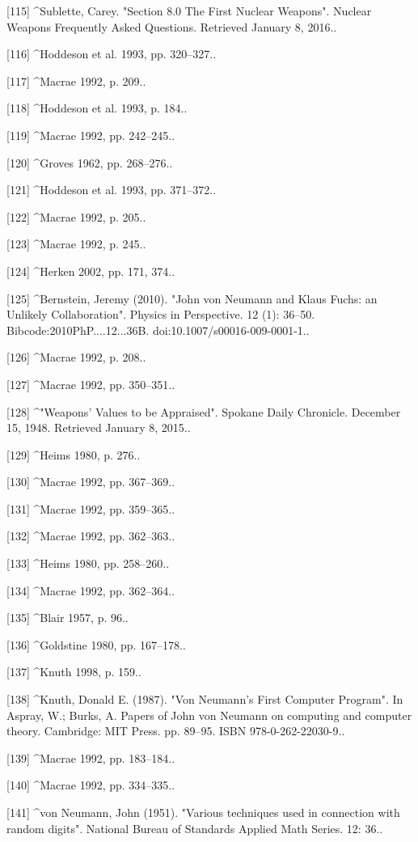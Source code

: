 [115]
^Sublette, Carey. "Section 8.0 The First Nuclear Weapons". Nuclear Weapons Frequently Asked Questions. Retrieved January 8, 2016..

[116]
^Hoddeson et al. 1993, pp. 320–327..

[117]
^Macrae 1992, p. 209..

[118]
^Hoddeson et al. 1993, p. 184..

[119]
^Macrae 1992, pp. 242–245..

[120]
^Groves 1962, pp. 268–276..

[121]
^Hoddeson et al. 1993, pp. 371–372..

[122]
^Macrae 1992, p. 205..

[123]
^Macrae 1992, p. 245..

[124]
^Herken 2002, pp. 171, 374..

[125]
^Bernstein, Jeremy (2010). "John von Neumann and Klaus Fuchs: an Unlikely Collaboration". Physics in Perspective. 12 (1): 36–50. Bibcode:2010PhP....12...36B. doi:10.1007/s00016-009-0001-1..

[126]
^Macrae 1992, p. 208..

[127]
^Macrae 1992, pp. 350–351..

[128]
^"Weapons' Values to be Appraised". Spokane Daily Chronicle. December 15, 1948. Retrieved January 8, 2015..

[129]
^Heims 1980, p. 276..

[130]
^Macrae 1992, pp. 367–369..

[131]
^Macrae 1992, pp. 359–365..

[132]
^Macrae 1992, pp. 362–363..

[133]
^Heims 1980, pp. 258–260..

[134]
^Macrae 1992, pp. 362–364..

[135]
^Blair 1957, p. 96..

[136]
^Goldstine 1980, pp. 167–178..

[137]
^Knuth 1998, p. 159..

[138]
^Knuth, Donald E. (1987). "Von Neumann's First Computer Program". In Aspray, W.; Burks, A. Papers of John von Neumann on computing and computer theory. Cambridge: MIT Press. pp. 89–95. ISBN 978-0-262-22030-9..

[139]
^Macrae 1992, pp. 183–184..

[140]
^Macrae 1992, pp. 334–335..

[141]
^von Neumann, John (1951). "Various techniques used in connection with random digits". National Bureau of Standards Applied Math Series. 12: 36..

